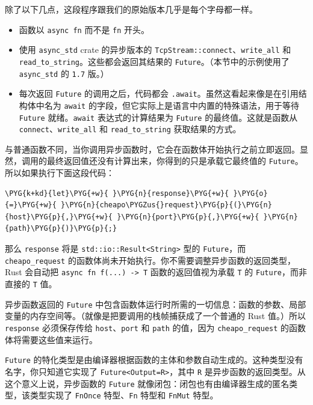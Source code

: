 除了以下几点，这段程序跟我们的原始版本几乎是每个字母都一样。

\begin{itemize}
\item 函数以 \texttt{async fn} 而不是 \texttt{fn} 开头。
\item 使用 \texttt{async\_std} crate 的异步版本的 \texttt{TcpStream::connect}、\texttt{write\_all} 和 \texttt{read\_to\_string}。这些都会返回其结果的 \texttt{Future}。（本节中的示例使用了 \texttt{async\_std} 的 \texttt{1.7} 版。）
\item 每次返回 \texttt{Future} 的调用之后，代码都会 \texttt{.await}。虽然这看起来像是在引用结构体中名为 \texttt{await} 的字段，但它实际上是语言中内置的特殊语法，用于等待 \texttt{Future} 就绪。\texttt{await} 表达式的计算结果为 \texttt{Future} 的最终值。这就是函数从 \texttt{connect}、\texttt{write\_all} 和 \texttt{read\_to\_string} 获取结果的方式。
\end{itemize}

与普通函数不同，当你调用异步函数时，它会在函数体开始执行之前立即返回。显然，调用的最终返回值还没有计算出来，你得到的只是承载它最终值的 \texttt{Future}。所以如果执行下面这段代码：

\begin{Verbatim}[commandchars=\\\{\},breaklines=true,breakanywhere=true,fontsize=\codefont,xleftmargin=17bp]
\PYG{k+kd}{let}\PYG{+w}{ }\PYG{n}{response}\PYG{+w}{ }\PYG{o}{=}\PYG{+w}{ }\PYG{n}{cheapo\PYGZus{}request}\PYG{p}{(}\PYG{n}{host}\PYG{p}{,}\PYG{+w}{ }\PYG{n}{port}\PYG{p}{,}\PYG{+w}{ }\PYG{n}{path}\PYG{p}{)}\PYG{p}{;}
\end{Verbatim}

那么 \texttt{response} 将是 \texttt{std::io::Result<String>} 型的 \texttt{Future}，而 \texttt{cheapo\_request} 的函数体尚未开始执行。你不需要调整异步函数的返回类型，Rust 会自动把 \texttt{async fn f(...) -> T} 函数的返回值视为承载 \texttt{T} 的 \texttt{Future}，而非直接的 \texttt{T} 值。

异步函数返回的 \texttt{Future} 中包含函数体运行时所需的一切信息：函数的参数、局部变量的内存空间等。（就像是把要调用的栈帧捕获成了一个普通的 Rust 值。）所以 \texttt{response} 必须保存传给 \texttt{host}、\texttt{port} 和 \texttt{path} 的值，因为 \texttt{cheapo\_request} 的函数体将需要这些值来运行。

\texttt{Future} 的特化类型是由编译器根据函数的主体和参数自动生成的。这种类型没有名字，你只知道它实现了 \texttt{Future<Output=R>}，其中 \texttt{R} 是异步函数的返回类型。从这个意义上说，异步函数的 \texttt{Future} 就像闭包：闭包也有由编译器生成的匿名类型，该类型实现了 \texttt{FnOnce} 特型、\texttt{Fn} 特型和 \texttt{FnMut} 特型。

